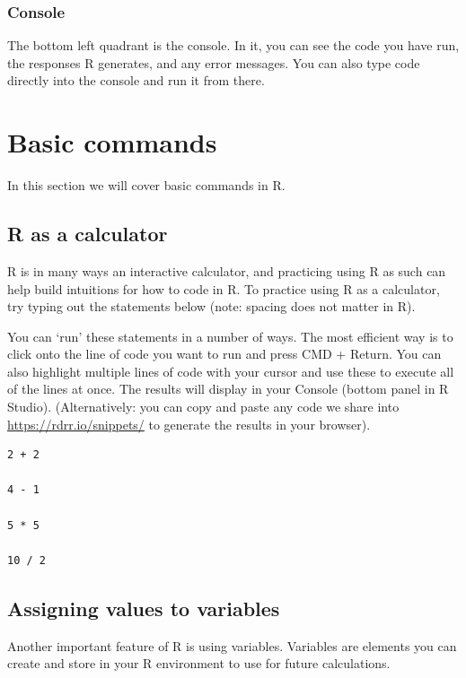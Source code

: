 \documentclass[
]{book}
\begin{document}
\hypertarget{console}{%
\subsection{Console}\label{console}}

The bottom left quadrant is the console. In it, you can see the code you have run, the responses R generates, and any error messages. You can also type code directly into the console and run it from there.

\hypertarget{basic-commands}{%
\chapter{Basic commands}\label{basic-commands}}

In this section we will cover basic commands in R.

\hypertarget{r-as-a-calculator}{%
\section{R as a calculator}\label{r-as-a-calculator}}

R is in many ways an interactive calculator, and practicing using R as such can help build intuitions for how to code in R. To practice using R as a calculator, try typing out the statements below (note: spacing does not matter in R).

You can `run' these statements in a number of ways. The most efficient way is to click onto the line of code you want to run and press CMD + Return. You can also highlight multiple lines of code with your cursor and use these to execute all of the lines at once. The results will display in your Console (bottom panel in R Studio). (Alternatively: you can copy and paste any code we share into \url{https://rdrr.io/snippets/} to generate the results in your browser).

\begin{verbatim}
2 + 2

4 - 1

5 * 5

10 / 2
\end{verbatim}

\hypertarget{assigning-values-to-variables}{%
\section{Assigning values to variables}\label{assigning-values-to-variables}}

Another important feature of R is using variables. Variables are elements you can create and store in your R environment to use for future calculations.
\end{document}
